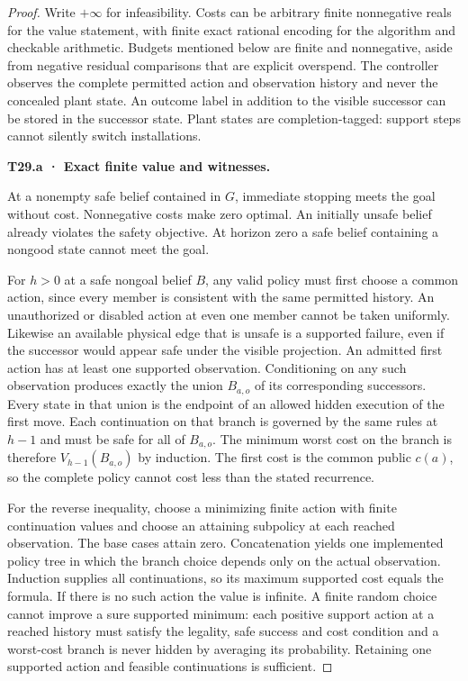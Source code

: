 \begin{proof}

Write \(+\infty\) for infeasibility. Costs can be arbitrary finite nonnegative reals for the value statement, with finite exact rational encoding for the algorithm and checkable arithmetic. Budgets mentioned below are finite and nonnegative, aside from negative residual comparisons that are explicit overspend. The controller observes the complete permitted action and observation history and never the concealed plant state. An outcome label in addition to the visible successor can be stored in the successor state. Plant states are completion-tagged: support steps cannot silently switch installations.

\textbf{T29.a · Exact finite value and witnesses.}

At a nonempty safe belief contained in \(G\), immediate stopping meets the goal without cost. Nonnegative costs make zero optimal. An initially unsafe belief already violates the safety objective. At horizon zero a safe belief containing a nongood state cannot meet the goal.

For \(h>0\) at a safe nongoal belief \(B\), any valid policy must first choose a common action, since every member is consistent with the same permitted history. An unauthorized or disabled action at even one member cannot be taken uniformly. Likewise an available physical edge that is unsafe is a supported failure, even if the successor would appear safe under the visible projection. An admitted first action has at least one supported observation. Conditioning on any such observation produces exactly the union \(B_{a,o}\) of its corresponding successors. Every state in that union is the endpoint of an allowed hidden execution of the first move. Each continuation on that branch is governed by the same rules at \(h-1\) and must be safe for all of \(B_{a,o}\). The minimum worst cost on the branch is therefore \(V_{h-1}(B_{a,o})\) by induction. The first cost is the common public \(c(a)\), so the complete policy cannot cost less than the stated recurrence.

For the reverse inequality, choose a minimizing finite action with finite continuation values and choose an attaining subpolicy at each reached observation. The base cases attain zero. Concatenation yields one implemented policy tree in which the branch choice depends only on the actual observation. Induction supplies all continuations, so its maximum supported cost equals the formula. If there is no such action the value is infinite. A finite random choice cannot improve a sure supported minimum: each positive support action at a reached history must satisfy the legality, safe success and cost condition and a worst-cost branch is never hidden by averaging its probability. Retaining one supported action and feasible continuations is sufficient.


\end{proof}
